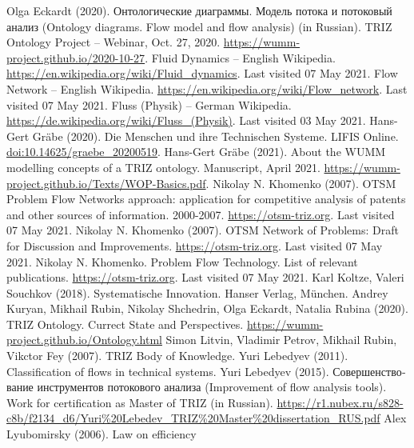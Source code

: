\documentclass[a4paper,11pt]{article}
\newcommand{\ru}[1]{\foreignlanguage{russian}{#1}}
\begin{document}
\newpage
\begin{thebibliography}{...}
\raggedright
{} Olga Eckardt (2020).  \ru{Онтологические
  диаграммы. Модель потока и потоковый анализ} (Ontology diagrams.  Flow model
  and flow analysis) (in Russian). TRIZ Ontology Project -- Webinar, Oct. 27,
  2020.  \url{https://wumm-project.github.io/2020-10-27}.
 Fluid Dynamics -- English Wikipedia.
  \url{https://en.wikipedia.org/wiki/Fluid_dynamics}. Last visited 07 May
  2021.
 Flow Network -- English Wikipedia.
  \url{https://en.wikipedia.org/wiki/Flow_network}. Last visited 07 May 2021.
 Fluss (Physik) -- German Wikipedia.
  \url{https://de.wikipedia.org/wiki/Fluss_(Physik)}. Last visited 03 May
  2021.
 Hans-Gert Gr\"abe (2020).  Die Menschen und ihre
  Technischen Systeme. LIFIS Online.  \url{doi:10.14625/graebe_20200519}.
 Hans-Gert Gr\"abe (2021). About the WUMM modelling
  concepts of a TRIZ ontology.  Manuscript, April 2021.
  \url{https://wumm-project.github.io/Texts/WOP-Basics.pdf}.
 Nikolay N. Khomenko (2007). OTSM Problem Flow Networks
  approach: application for competitive analysis of patents and other sources
  of information. 2000-2007.  \url{https://otsm-triz.org}.  Last visited 07
  May 2021.
 Nikolay N. Khomenko (2007).  OTSM Network of
  Problems: Draft for Discussion and Improvements.
  \url{https://otsm-triz.org}. Last visited 07 May 2021.
 Nikolay N. Khomenko. Problem Flow Technology.  List
  of relevant publications.  \url{https://otsm-triz.org}. Last visited 07 May
  2021.
 Karl Koltze, Valeri Souchkov (2018).
  Systematische Innovation. Hanser Verlag, München.
 Andrey Kuryan, Mikhail Rubin, Nikolay Shchedrin,
  Olga Eckardt, Natalia Rubina (2020). TRIZ Ontology. Currect State and
  Perspectives.  \url{https://wumm-project.github.io/Ontology.html} 
 Simon Litvin, Vladimir Petrov, Mikhail Rubin,
  Vikctor Fey (2007).  TRIZ Body of Knowledge.
 Yuri Lebedyev (2011). Classification of flows in
  technical systems. 
 Yuri Lebedyev (2015).  \ru{Совершенствование
  инструментов потокового анализа} (Improvement of flow analysis tools). Work
  for certification as Master of TRIZ (in Russian).
  \url{https://r1.nubex.ru/s828-c8b/f2134_d6/Yuri%20Lebedev_TRIZ%20Master%20dissertation_RUS.pdf}
 Alex Lyubomirsky (2006). Law on efficiency

\end{thebibliography}
\end{document}
